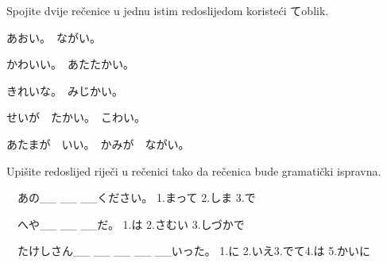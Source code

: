 

\author{Tomislav Mamić, Željka Ludošan}	%


	
	
	\begin{mondai}{Spojite dvije rečenice u jednu istim redoslijedom koristeći てoblik.
		\begin{reibun}[Primjer:]
		\end{reibun} }

		\item あおい。　ながい。
		\item かわいい。　あたたかい。
		\item きれいな。　みじかい。 %
		\item せいが　たかい。　こわい。%
		\item あたまが　いい。　かみが　ながい。　
		\vspace{-15pt} %
	\end{mondai}

	\begin{mondai}{Upišite redoslijed riječi u rečenici tako da rečenica bude gramatički ispravna. 
		\begin{reibun}[Primjer:]
		\end{reibun} }

		\item　あの\_\_ \_\_ \_\_ください。
		\vspace{10pt}
		\newline 1.まって 2.しま 3.で
		\vspace{20pt}
		\item　へや\_\_ \_\_ \_\_だ。 %
		\vspace{10pt}
		\newline 1.は 2.さむい 3.しづかで
		\vspace{20pt}
		\item　たけしさん\_\_ \_\_ \_\_ \_\_ \_\_いった。 %
		\vspace{10pt}
		\newline 1.に 2.いえ3.でて4.は 5.かいに
	\end{mondai}

